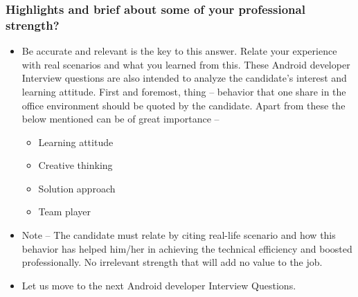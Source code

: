\documentclass[9pt, b5paper]{article}
\begin{document}
\subsubsection{Highlights and brief about some of your professional strength?}
\label{sec-1-9-2}
\begin{itemize}
\item Be accurate and relevant is the key to this answer. Relate your experience with real scenarios and what you learned from this. These Android developer Interview questions are also intended to analyze the candidate's interest and learning attitude. First and foremost, thing – behavior that one share in the office environment should be quoted by the candidate. Apart from these the below mentioned can be of great importance –
\begin{itemize}
\item Learning attitude
\item Creative thinking
\item Solution approach
\item Team player
\end{itemize}
\item Note – The candidate must relate by citing real-life scenario and how this behavior has helped him/her in achieving the technical efficiency and boosted professionally. No irrelevant strength that will add no value to the job.
\item Let us move to the next Android developer Interview Questions.
\end{itemize}
\end{document}
